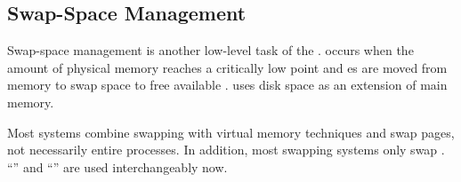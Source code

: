 \subsection{Swap-Space Management}\label{subsec:Swap_Space_Management}
Swap-space management is another low-level task of the .
 occurs when the amount of physical memory reaches a critically low point and es are moved from memory to swap space to free available .
 uses disk space as an extension of main memory.

Most systems combine swapping with virtual memory techniques and swap pages, not necessarily entire processes.
In addition, most swapping systems only swap .
``'' and ``'' are used interchangeably now.


